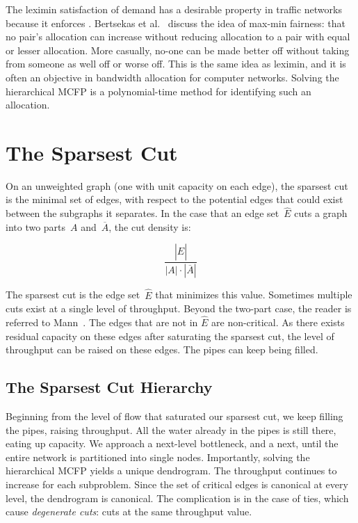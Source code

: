 The leximin satisfaction of demand has a desirable property in traffic networks because it enforces . Bertsekas et al.~\cite{bertsekas1992data} discuss the idea of max-min fairness: that no pair's allocation can increase without reducing allocation to a pair with equal or lesser allocation. More casually, no-one can be made better off without taking from someone as well off or worse off. This is the same idea as leximin, and it is often an objective in bandwidth allocation for computer networks. Solving the hierarchical MCFP is a polynomial-time method for identifying such an allocation.







\section{The Sparsest Cut} \label{sec:sparsest cut}

On an unweighted graph (one with unit capacity on each edge), the sparsest cut is the minimal set of edges, with respect to the potential edges that could exist between the subgraphs it separates. In the case that an edge set~$\hat{E}$ cuts a graph into two parts~$A$ and~$\overline{A}$, the cut density is:

$$\frac{|\hat{E}|}{|A| \cdot |\overline{A}|}$$

The sparsest cut is the edge set~$\hat{E}$ that minimizes this value. Sometimes multiple cuts exist at a single level of throughput. Beyond the two-part case, the reader is referred to Mann~\cite{mann2008extensions, mann2008sparsest}. The edges that are not in $\hat{E}$ are non-critical. As there exists residual capacity on these edges after saturating the sparsest cut, the level of throughput can be raised on these edges. The pipes can keep being filled.



\subsection{The Sparsest Cut Hierarchy}

Beginning from the level of flow that saturated our sparsest cut, we keep filling the pipes, raising throughput. All the water already in the pipes is still there, eating up capacity. We approach a next-level bottleneck, and a next, until the entire network is partitioned into single nodes. Importantly, solving the hierarchical MCFP yields a unique dendrogram. The throughput continues to increase for each subproblem. Since the set of critical edges is canonical at every level, the dendrogram is canonical. The complication is in the case of ties, which cause \emph{degenerate cuts}: cuts at the same throughput value.

